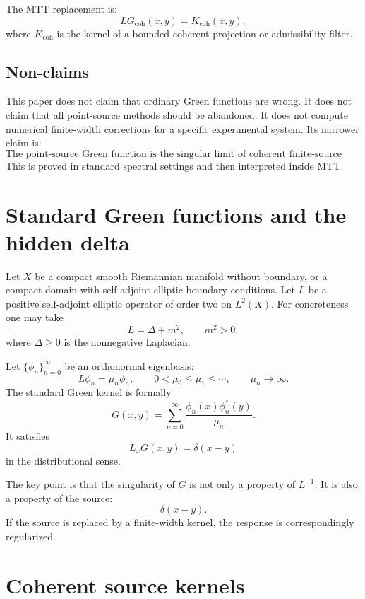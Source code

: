 \documentclass[11pt]{article}
\begin{document}
The MTT replacement is:
\begin{equation}
LG_{\mathrm{coh}}(x,y)=K_{\mathrm{coh}}(x,y),
\end{equation}
where \(K_{\mathrm{coh}}\) is the kernel of a bounded coherent projection or admissibility filter.

\subsection*{Non-claims}

This paper does not claim that ordinary Green functions are wrong. It does not claim that all point-source methods should be abandoned. It does not compute numerical finite-width corrections for a specific experimental system. Its narrower claim is:
\[
\boxed{
\text{The point-source Green function is the singular limit of coherent finite-source Green functions.}
}
\]
This is proved in standard spectral settings and then interpreted inside MTT.

\section{Standard Green functions and the hidden delta}

Let \(X\) be a compact smooth Riemannian manifold without boundary, or a compact domain with self-adjoint elliptic boundary conditions. Let \(L\) be a positive self-adjoint elliptic operator of order two on \(L^2(X)\). For concreteness one may take
\[
L=\Delta+m^2,\qquad m^2>0,
\]
where \(\Delta\ge 0\) is the nonnegative Laplacian.

Let \(\{ \phi_n\}_{n=0}^\infty\) be an orthonormal eigenbasis:
\[
L\phi_n=\mu_n\phi_n,\qquad 0<\mu_0\le \mu_1\le\cdots,\qquad \mu_n\to\infty.
\]
The standard Green kernel is formally
\begin{equation}
G(x,y)=\sum_{n=0}^\infty \frac{\phi_n(x)\phi_n^*(y)}{\mu_n}.
\end{equation}
It satisfies
\begin{equation}
L_xG(x,y)=\delta(x-y)
\end{equation}
in the distributional sense.

The key point is that the singularity of \(G\) is not only a property of \(L^{-1}\). It is also a property of the source:
\[
\delta(x-y).
\]
If the source is replaced by a finite-width kernel, the response is correspondingly regularized.

\section{Coherent source kernels}
\end{document}
